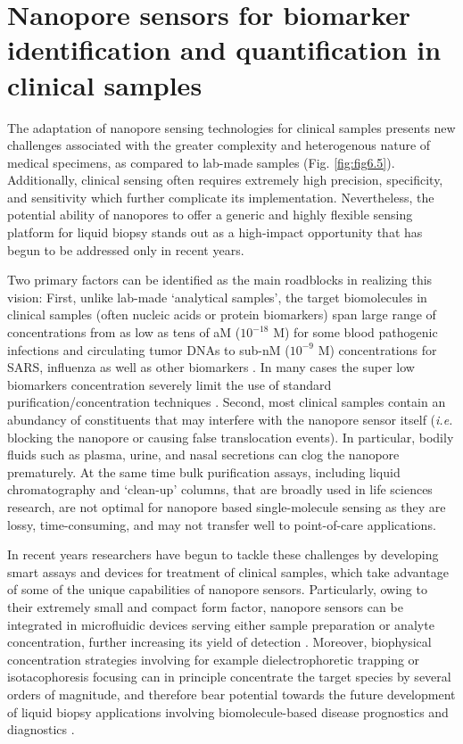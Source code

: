 \section[Nanopore sensors for biomarker identification and quantification in clinical samples]{Nanopore sensors for biomarker identification and quantification in clinical samples}

The adaptation of nanopore sensing technologies for clinical samples presents new challenges associated with the greater complexity and heterogenous nature of medical specimens, as compared to lab-made samples (Fig. \ref{fig:fig6.5}). Additionally, clinical sensing often requires extremely high precision, specificity, and sensitivity which further complicate its implementation. Nevertheless, the potential ability of nanopores to offer a generic and highly flexible sensing platform for liquid biopsy stands out as a high-impact opportunity that has begun to be addressed only in recent years.


Two primary factors can be identified as the main roadblocks in realizing this vision: First, unlike lab-made `analytical samples', the target biomolecules in clinical samples (often nucleic acids or protein biomarkers) span large range of concentrations from as low as tens of aM ($10^{-18}$ M) for some blood pathogenic infections and circulating tumor DNAs to sub-nM ($10^{-9}$ M) concentrations for SARS, influenza as well as other biomarkers \cite{Kelley2017}. In many cases the super low biomarkers concentration severely limit the use of standard purification/concentration techniques \cite{Galenkamp2018}. Second, most clinical samples contain an abundancy of constituents that may interfere with the nanopore sensor itself (\emph{i.e.} blocking the nanopore or causing false translocation events). In particular, bodily fluids such as plasma, urine, and nasal secretions can clog the nanopore prematurely. At the same time bulk purification assays, including liquid chromatography and `clean-up' columns, that are broadly used in life sciences research, are not optimal for nanopore based single-molecule sensing as they are lossy, time-consuming, and may not transfer well to point-of-care applications.


In recent years researchers have begun to tackle these challenges by developing smart assays and devices for treatment of clinical samples, which take advantage of some of the unique capabilities of nanopore sensors. Particularly, owing to their extremely small and compact form factor, nanopore sensors can be integrated in microfluidic devices serving either sample preparation or analyte concentration, further increasing its yield of detection \cite{Galenkamp2018}. Moreover, biophysical concentration strategies involving for example dielectrophoretic trapping or isotacophoresis focusing can in principle concentrate the target species by several orders of magnitude, and therefore bear potential towards the future development of liquid biopsy applications involving biomolecule-based disease prognostics and diagnostics \cite{Freedman2016,Spitzberg2020}. 


